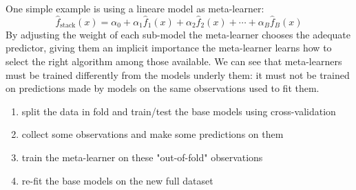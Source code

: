 One simple example is using a lineare model as meta-learner:
$$
\hat{f}_{\text{stack}}(x) = \alpha_0 + \alpha_1 \hat{f}_1(x) + \alpha_2 \hat{f}_2(x) + \cdots + \alpha_B \hat{f}_B(x)
$$
By adjusting the weight of each sub-model the meta-learner chooses the adequate predictor, giving them an implicit importance \arrow the meta-learner learns how to select the right algorithm among those available.
\vspace{0.2cm}
We can see that meta-learners must be trained differently from the models underly them: it must not be trained on predictions made by models on the same observations used to fit them.
\begin{enumerate}
    \item split the data in fold and train/test the base models using cross-validation
    \item collect some observations and make some predictions on them
    \item train the meta-learner on these "out-of-fold" observations
    \item re-fit the base models on the new full dataset
\end{enumerate}